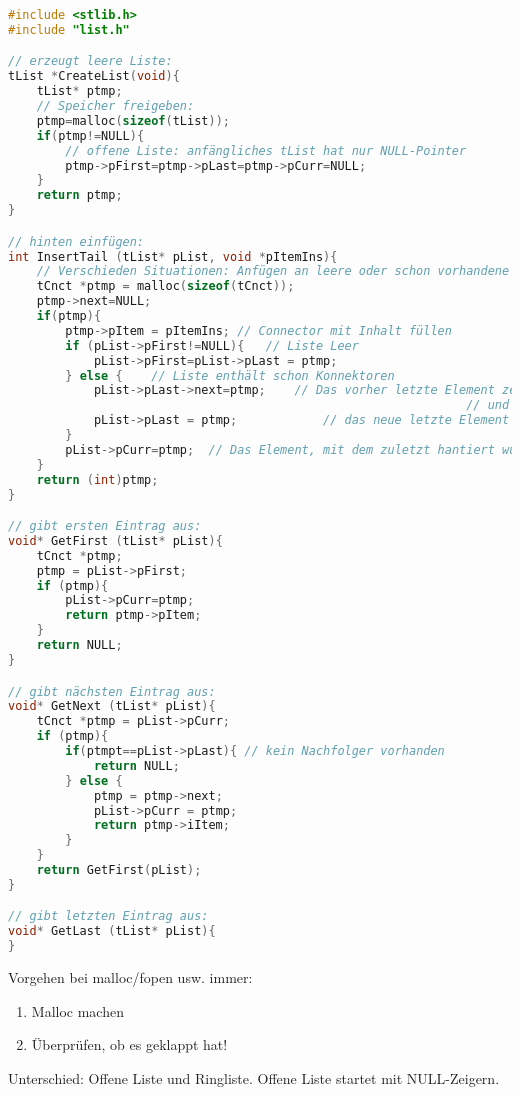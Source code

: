 \begin{lstlisting}[language=C]
#include <stlib.h>
#include "list.h"

// erzeugt leere Liste:
tList *CreateList(void){
	tList* ptmp;
	// Speicher freigeben:
	ptmp=malloc(sizeof(tList));
	if(ptmp!=NULL){
		// offene Liste: anfängliches tList hat nur NULL-Pointer
		ptmp->pFirst=ptmp->pLast=ptmp->pCurr=NULL;
	}
	return ptmp;
}

// hinten einfügen:
int InsertTail (tList* pList, void *pItemIns){
	// Verschieden Situationen: Anfügen an leere oder schon vorhandene Liste
	tCnct *ptmp = malloc(sizeof(tCnct));
	ptmp->next=NULL;
	if(ptmp){
		ptmp->pItem = pItemIns;	// Connector mit Inhalt füllen
		if (pList->pFirst!=NULL){	// Liste Leer
			pList->pFirst=pList->pLast = ptmp;
		} else {	// Liste enthält schon Konnektoren
			pList->pLast->next=ptmp;	// Das vorher letzte Element zeigt nun auf das eingefügte
																// und damit neue letzte Element
			pList->pLast = ptmp;			// das neue letzte Element
		}
		pList->pCurr=ptmp;	// Das Element, mit dem zuletzt hantiert wurde ist pCurr
	}
	return (int)ptmp;
}

// gibt ersten Eintrag aus:
void* GetFirst (tList* pList){
	tCnct *ptmp;
	ptmp = pList->pFirst;
	if (ptmp){
		pList->pCurr=ptmp;
		return ptmp->pItem;
	}
	return NULL;
}

// gibt nächsten Eintrag aus:
void* GetNext (tList* pList){
	tCnct *ptmp = pList->pCurr;
	if (ptmp){
		if(ptmpt==pList->pLast){ // kein Nachfolger vorhanden
			return NULL;
		} else {
			ptmp = ptmp->next;
			pList->pCurr = ptmp;
			return ptmp->iItem;
		}
	} 
	return GetFirst(pList);
}

// gibt letzten Eintrag aus:
void* GetLast (tList* pList){
}

\end{lstlisting}

Vorgehen bei malloc/fopen usw. immer:
\begin{enumerate}
\item Malloc machen
\item Überprüfen, ob es geklappt hat!
\end{enumerate}

Unterschied: Offene Liste und Ringliste. Offene Liste startet mit NULL-Zeigern.

